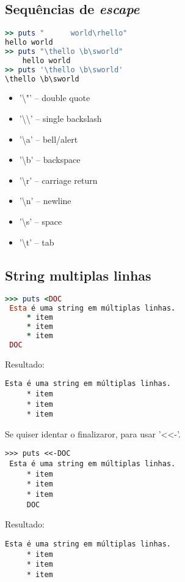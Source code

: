 \documentclass[serif,mathserif]{book}
\begin{document}
\subsection{Sequências de \em{escape}}

\begin{lstlisting}[language=ruby]
>> puts "      world\rhello"
hello world
>> puts "\thello \b\sworld"
    hello world
>> puts '\thello \b\sworld'
\thello \b\sworld
\end{lstlisting}

\begin{itemize}
  \item  '\textbackslash"' – double quote
  \item  '\textbackslash\textbackslash' – single backslash
  \item  '\textbackslash{}a' – bell/alert
  \item  '\textbackslash{}b' – backspace
  \item  '\textbackslash{}r' – carriage return
  \item  '\textbackslash{}n' – newline
  \item  '\textbackslash{}s' – space
  \item  '\textbackslash{}t' – tab
\end{itemize}


\subsection{String multiplas linhas}

\begin{lstlisting}[language=ruby]
>>> puts <DOC
 Esta é uma string em múltiplas linhas.
     * item
     * item
     * item
 DOC
\end{lstlisting}

Resultado:
\begin{lstlisting}[style=BashOutputStyle]
 Esta é uma string em múltiplas linhas.
     * item
     * item
     * item
\end{lstlisting}

Se quiser identar o finalizaror, para usar '<<-'.

\begin{lstlisting}[style=BashOutputStyle]
>>> puts <<-DOC
 Esta é uma string em múltiplas linhas.
     * item
     * item
     * item
     DOC
\end{lstlisting}

Resultado:
 \begin{lstlisting}[style=BashOutputStyle]
 Esta é uma string em múltiplas linhas.
     * item
     * item
     * item 
 \end{lstlisting}
\end{document}
